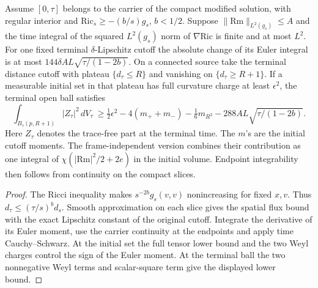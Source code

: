 \begin{theorem}
\label{thm:ed03-terminal-ball-euler}
\leanok
Assume $[0,\tau]$ belongs to the carrier of the compact modified solution,
with regular interior and $\mathrm{Ric}_s\ge-(b/s)g_s$, $b<1/2$.
Suppose $\|\mathrm{Rm}\|_{L^2(g_s)}\le A$ and the time integral of the
squared $L^2(g_s)$ norm of $\nabla\mathrm{Ric}$ is finite and at most $L^2$.
For one fixed terminal $\delta$-Lipschitz cutoff the absolute change
of its Euler integral is at most $144\delta A L\sqrt{\tau/(1-2b)}$.
On a connected source take the terminal distance cutoff with plateau
$\{d_\tau\le R\}$ and vanishing on $\{d_\tau\ge R+1\}$. If a measurable
initial set in that plateau has full curvature charge at least
$\epsilon^2$, the terminal open ball satisfies
\[
 \int_{B_\tau(p,R+1)} |Z_\tau|^2\,dV_\tau\ \ge \tfrac{1}{2}\epsilon^2-4(m_++m_-)-\tfrac{1}{6}m_{R^2}
 -288 A L\sqrt{\tau/(1-2b)}.
\]
Here $Z_\tau$ denotes the trace-free part at the terminal time.
The $m$'s are the initial cutoff moments. The frame-independent version
combines their contribution as one integral of $\chi(|\mathrm{Rm}|^2/2+2e)$
in the initial volume. Endpoint integrability then follows from continuity
on the compact slices.
\end{theorem}
\begin{proof}
\leanok
The Ricci inequality makes $s^{-2b}g_s(v,v)$ nonincreasing for fixed
$x,v$. Thus $d_\tau\le(\tau/s)^b d_s$. Smooth approximation on each
slice gives the spatial flux bound with the exact Lipschitz constant
of the original cutoff. Integrate the derivative of its Euler moment,
use the carrier continuity at the endpoints and apply time
Cauchy--Schwarz. At the initial set the full tensor lower bound and
the two Weyl charges control the sign of the Euler moment. At the
terminal ball the two nonnegative Weyl terms and scalar-square term
give the displayed lower bound.
\end{proof}

